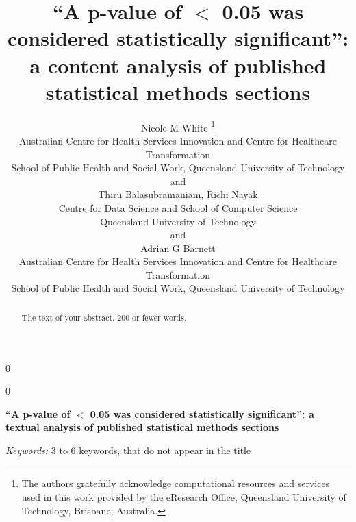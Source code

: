 \documentclass[12pt]{article}
\newcommand{\blind}{0}
\begin{document}
\def\spacingset#1{\renewcommand{\baselinestretch}%
{#1}\small\normalsize} \spacingset{1}



\blind
{
  \title{\bf ``A p-value of $<$ 0.05 was considered statistically significant'': a content analysis of published statistical methods sections}

  \author{
        Nicole M White \thanks{The authors gratefully acknowledge computational resources and services
used in this work provided by the eResearch Office, Queensland
University of Technology, Brisbane, Australia.} \\
    \small{Australian Centre for Health Services Innovation and Centre for Healthcare Transformation} \\
\small{School of Public Health and Social Work, Queensland University of Technology} \\
     and \\     Thiru Balasubramaniam, Richi Nayak \\
    \small{Centre for Data Science and School of Computer Science} \\
\small{Queensland University of Technology} \\
     and \\     Adrian G Barnett \\
    \small{Australian Centre for Health Services Innovation and Centre for Healthcare Transformation} \\
\small{School of Public Health and Social Work, Queensland University of Technology} \\
      }
  \maketitle
} \fi

\blind
{
  \bigskip
  \bigskip
  \bigskip
  \begin{center}
    {\LARGE\bf ``A p-value of $<$ 0.05 was considered statistically significant'': a textual analysis of published statistical methods sections}
  \end{center}
  \medskip
} \fi

\bigskip
\begin{abstract}
The text of your abstract. 200 or fewer words.
\end{abstract}

\noindent%
{\it Keywords:} 3 to 6 keywords, that do not appear in the title
\vfill
\end{document}
